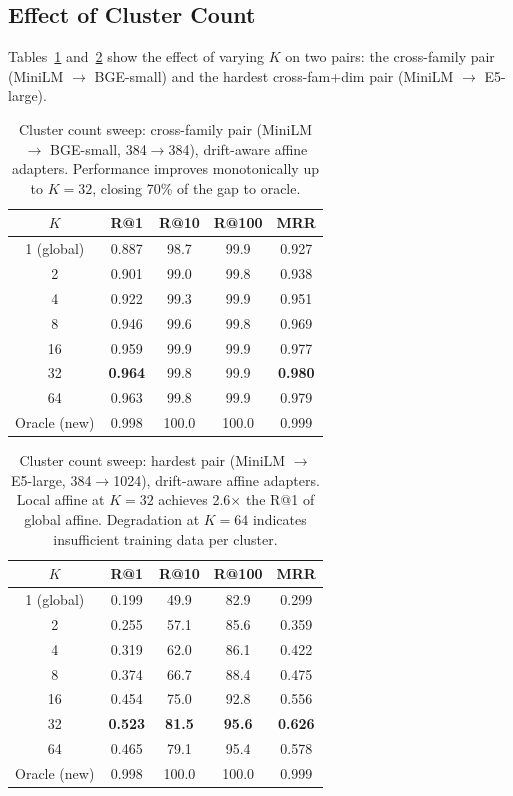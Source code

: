 \documentclass[11pt,a4paper]{article}
\begin{document}
\subsection{Effect of Cluster Count}
\label{sec:results:clusters}

Tables~\ref{tab:sweep_crossfam} and~\ref{tab:sweep_hard} show the effect of varying $K$ on two pairs: the cross-family pair (MiniLM $\to$ BGE-small) and the hardest cross-fam+dim pair (MiniLM $\to$ E5-large).

\begin{table}[h]
\centering
\small
\begin{tabular}{@{}ccccc@{}}
\toprule
$K$ & \textbf{R@1} & \textbf{R@10} & \textbf{R@100} & \textbf{MRR} \\
\midrule
1 (global)   & 0.887 & 98.7 & 99.9 & 0.927 \\
2            & 0.901 & 99.0 & 99.8 & 0.938 \\
4            & 0.922 & 99.3 & 99.9 & 0.951 \\
8            & 0.946 & 99.6 & 99.8 & 0.969 \\
16           & 0.959 & 99.9 & 99.9 & 0.977 \\
32           & \textbf{0.964} & 99.8 & 99.9 & \textbf{0.980} \\
64           & 0.963 & 99.8 & 99.9 & 0.979 \\
\midrule
Oracle (new) & 0.998 & 100.0 & 100.0 & 0.999 \\
\bottomrule
\end{tabular}
\caption{Cluster count sweep: cross-family pair (MiniLM $\to$ BGE-small, 384$\to$384), drift-aware affine adapters. Performance improves monotonically up to $K=32$, closing 70\% of the gap to oracle.}
\label{tab:sweep_crossfam}
\end{table}

\begin{table}[h]
\centering
\small
\begin{tabular}{@{}ccccc@{}}
\toprule
$K$ & \textbf{R@1} & \textbf{R@10} & \textbf{R@100} & \textbf{MRR} \\
\midrule
1 (global)   & 0.199 & 49.9 & 82.9 & 0.299 \\
2            & 0.255 & 57.1 & 85.6 & 0.359 \\
4            & 0.319 & 62.0 & 86.1 & 0.422 \\
8            & 0.374 & 66.7 & 88.4 & 0.475 \\
16           & 0.454 & 75.0 & 92.8 & 0.556 \\
32           & \textbf{0.523} & \textbf{81.5} & \textbf{95.6} & \textbf{0.626} \\
64           & 0.465 & 79.1 & 95.4 & 0.578 \\
\midrule
Oracle (new) & 0.998 & 100.0 & 100.0 & 0.999 \\
\bottomrule
\end{tabular}
\caption{Cluster count sweep: hardest pair (MiniLM $\to$ E5-large, 384$\to$1024), drift-aware affine adapters. Local affine at $K=32$ achieves 2.6$\times$ the R@1 of global affine. Degradation at $K=64$ indicates insufficient training data per cluster.}
\label{tab:sweep_hard}
\end{table}
\end{document}

